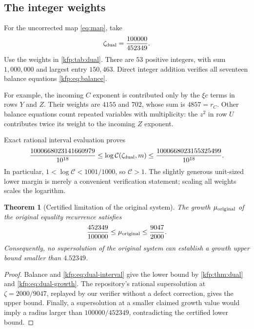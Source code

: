 \documentclass[11pt,a4paper]{article}
\newtheorem{theorem}{Theorem}[section]
\theoremstyle{definition}
\theoremstyle{remark}
\begin{document}
\subsection{The integer weights}
For the uncorrected map \eqref{eq:map}, take
\[
 \zeta_{\rm dual}=\frac{100000}{452349}.
\]
Use the weights in \cref{kfp:tab:dual}. There are $53$ positive integers, with
sum $1,000,000$ and largest entry $150,463$. Direct integer addition verifies
all seventeen balance equations \eqref{kfp:eq:balance}.

\begin{table}[htbp]
\centering\small

\caption{An explicit balanced-monomial certificate. The coefficient of every
monomial is one. Within each coordinate row, weights follow the term order
in \eqref{eq:map}.}
\label{kfp:tab:dual}
\end{table}

For example, the incoming $C$ exponent is contributed only by the
$\xi c$ terms in rows $Y$ and $Z$. Their weights are $4155$ and $702$,
whose sum is $4857=r_C$. Other balance equations count repeated variables
with multiplicity: the $z^2$ in row $U$ contributes twice its weight to the
incoming $Z$ exponent.

Exact rational interval evaluation proves
\begin{equation}\label{kfp:eq:dual-interval}
 \frac{1000668023141660979}{10^{18}}
 \leq \log\mathcal C(\zeta_{\rm dual},m)
 \leq \frac{1000668023155325499}{10^{18}}.
\end{equation}
In particular, $1<\log\mathcal C<1001/1000$, so
$\mathcal C>1$. The slightly generous unit-sized lower margin is merely a
convenient verification statement; scaling all weights scales the logarithm.

\begin{theorem}[Certified limitation of the original system]\label{kfp:thm:bracket}
The growth $\mu_{\rm original}$ of the original equality recurrence satisfies
\[
 \frac{452349}{100000}\leq\mu_{\rm original}\leq\frac{9047}{2000}.
\]
Consequently, no supersolution of the original system can establish a growth
upper bound smaller than $4.52349$.
\end{theorem}
\begin{proof}
Balance and \eqref{kfp:eq:dual-interval} give the lower bound by
\cref{kfp:thm:dual} and \eqref{kfp:eq:dual-growth}. The repository's rational
supersolution at $\zeta=2000/9047$, replayed by our verifier without a defect
correction, gives the upper bound. Finally, a supersolution at a smaller
claimed growth value would imply a radius larger than
$100000/452349$, contradicting the certified lower bound.
\end{proof}
\end{document}
